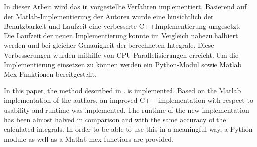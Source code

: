 \kurzfassung



In dieser Arbeit wird das in  vorgestellte Verfahren implementiert. Basierend auf der Matlab-Implementierung der Autoren wurde eine hinsichtlich der Benutzbarkeit und Laufzeit eine verbesserte C++Implementierung umgesetzt.
Die Laufzeit der neuen Implementierung konnte im Vergleich nahezu halbiert werden und bei gleicher Genauigkeit der berechneten Integrale.  
Diese Verbesserungen wurden mithilfe von CPU-Parallelisierungen erreicht. 
Um die Implementierung einsetzen zu können werden ein Python-Modul sowie Matlab Mex-Funktionen bereitgestellt.


\kurzfassungEN

In this paper, the method described in .
is implemented. Based on the Matlab implementation of the
authors, an improved C++ implementation with respect to usability and runtime was implemented. The runtime of the new implementation has been
almost halved in comparison and with the same accuracy of the calculated
integrals. In order to be able to use this in a meaningful way, a Python module as well as a
Matlab mex-functions are provided.